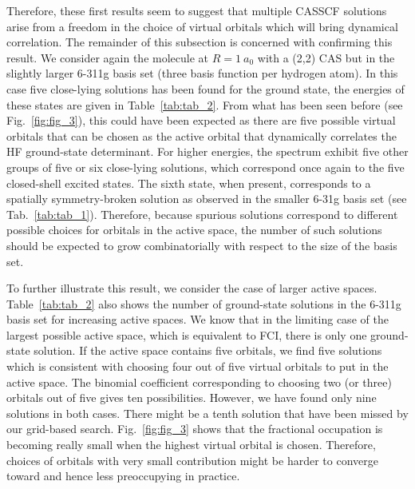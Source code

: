 \documentclass[aps,prb,reprint,showkeys,superscriptaddress]{revtex4-1}
\begin{document}
Therefore, these first results seem to suggest that multiple CASSCF solutions arise from a freedom in the choice of virtual orbitals which will bring dynamical correlation.
The remainder of this subsection is concerned with confirming this result.
We consider again the  molecule at $R=1~a_0$ with a (2,2) CAS but in the slightly larger 6-311g basis set (three basis function per hydrogen atom). \cite{Krishnan_1980}
In this case five close-lying solutions has been found for the ground state, the energies of these states are given in Table~\ref{tab:tab_2}.
From what has been seen before (see Fig.~\ref{fig:fig_3}), this could have been expected as there are five possible virtual orbitals that can be chosen as the active orbital that dynamically correlates the HF ground-state determinant.
For higher energies, the spectrum exhibit five other groups of five or six close-lying solutions, which correspond once again to the five closed-shell excited states.
The sixth state, when present, corresponds to a spatially symmetry-broken solution as observed in the smaller 6-31g basis set (see Tab.~\ref{tab:tab_1}).
Therefore, because spurious solutions correspond to different possible choices for orbitals in the active space, the number of such solutions should be expected to grow combinatorially with respect to the size of the basis set.

To further illustrate this result, we consider the case of larger active spaces.
Table~\ref{tab:tab_2} also shows the number of ground-state solutions in the 6-311g basis set for increasing active spaces.
We know that in the limiting case of the largest possible active space, which is equivalent to FCI, there is only one ground-state solution.
If the active space contains five orbitals, we find five solutions which is consistent with choosing four out of five virtual orbitals to put in the active space.
The binomial coefficient corresponding to choosing two (or three) orbitals out of five gives ten possibilities.
However, we have found only nine solutions in both cases.
There might be a tenth solution that have been missed by our grid-based search.
Fig.~\ref{fig:fig_3} shows that the fractional occupation is becoming really small when the highest virtual orbital is chosen.
Therefore, choices of orbitals with very small contribution might be harder to converge toward and hence less preoccupying in practice.
\end{document}
